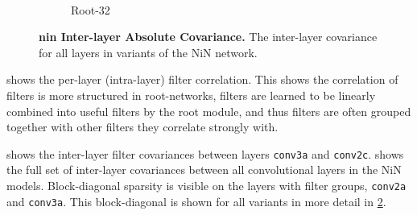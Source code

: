 \documentclass[thesis]{subfiles}
\begin{document}
{\begin{landscape}
\begin{figure}[p]
\begin{subfigure}[c]{0.95\linewidth}
					~
					\caption{Root-32}
					\label{fig:covarroot32}
				\end{subfigure}
				\caption[Inter-layer covariance (all layers)]{\textbf{\Gls{nin} Inter-layer Absolute Covariance.} The inter-layer covariance for all layers in variants of the NiN network.}
				\label{fig:suppcovariances}
			\end{figure}
		\end{landscape}
	}%
	
	 shows the per-layer (intra-layer) filter correlation. This shows the correlation of filters is more structured in root-networks, filters are learned to be linearly combined into useful filters by the root module, and thus filters are often grouped together with other filters they correlate strongly with.
	
	 shows the inter-layer filter covariances between layers \texttt{conv3a} and \texttt{conv2c}.  shows the full set of inter-layer covariances between all convolutional layers in the NiN models. Block-diagonal sparsity is visible on the layers with filter groups, \texttt{conv2a} and \texttt{conv3a}. This block-diagonal is shown for all variants in more detail in \cref{fig:suppcovariances}.
	
\end{document}
